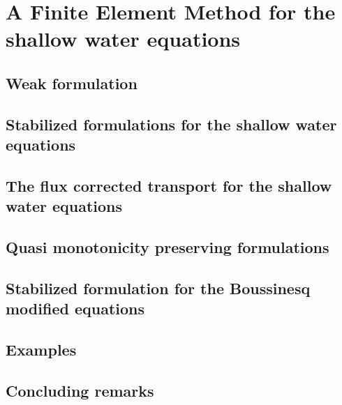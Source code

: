 
\chapter{A Finite Element Method for the shallow water equations}
\label{eulerian_sw}


\section{Weak formulation}


\section{Stabilized formulations for the shallow water equations}



\section{The flux corrected transport for the shallow water equations}



\section{Quasi monotonicity preserving formulations}



\section{Stabilized formulation for the Boussinesq modified equations}



\section{Examples}



\section{Concluding remarks}


